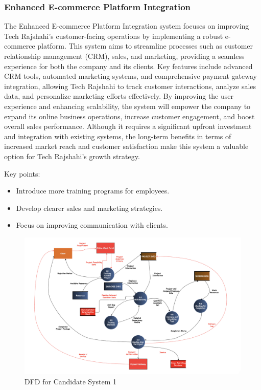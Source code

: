 \documentclass[12pt,a4paper]{article}
\begin{document}
\subsubsection*{Enhanced E-commerce Platform Integration} 
The Enhanced E-commerce Platform Integration system focuses on improving Tech Rajshahi’s customer-facing operations by implementing a robust e-commerce platform.  This system aims to streamline processes such as customer relationship management (CRM), sales, and marketing, providing a seamless experience for both the company and its clients.  Key features include advanced CRM tools, automated marketing systems, and comprehensive payment gateway integration, allowing Tech Rajshahi to track customer interactions, analyze sales data, and personalize marketing efforts effectively.  By improving the user experience and enhancing scalability, the system will empower the company to expand its online business operations, increase customer engagement, and boost overall sales performance.  Although it requires a significant upfront investment and integration with existing systems, the long-term benefits in terms of increased market reach and customer satisfaction make this system a valuable option for Tech Rajshahi’s growth strategy.

Key points:
\begin{itemize}
    \item Introduce more training programs for employees.
    \item Develop clearer sales and marketing strategies.
    \item Focus on improving communication with clients.
\end{itemize}

\begin{figure}[H]
    \centering
    \includegraphics[width=\textwidth]{Fig/dfd_candidate_system1.png}
    \caption{DFD for Candidate System 1}
    \label{fig:dfd_candidate_system1}
\end{figure}
\end{document}
